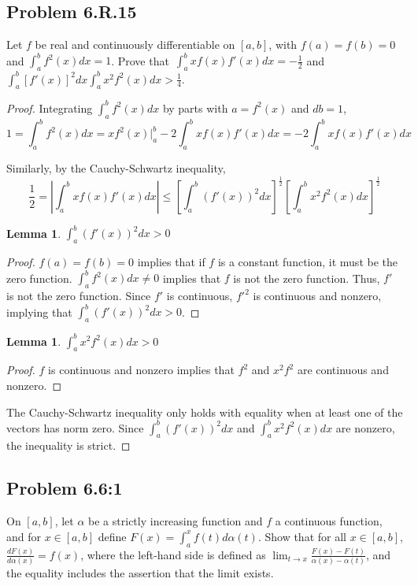 \documentclass{amsart}
\newtheorem{lemma}[theorem]{Lemma}
\begin{document}
\subsection*{Problem 6.R.15}
Let $f$ be real and continuously differentiable on $[a, b]$, with $f(a) = f(b) = 0$ and $\int_a^b f^2(x)dx = 1$. Prove that\ $\int_a^b xf(x)f'(x)dx = -\frac{1}{2}$ and $\int_a^b[f'(x)]^2dx \int_a^b x^2f^2(x)dx > \frac{1}{4}$.

\begin{proof}
Integrating $\int_a^b f^2(x)dx$ by parts with $a = f^2(x)$ and $db = 1$,
\[
1 = \int_a^bf^2(x)dx = xf^2(x)\Big|_a^b - 2\int_a^bxf(x)f'(x)dx = - 2\int_a^bxf(x)f'(x)dx
\]

Similarly, by the Cauchy-Schwartz inequality,
\[
\frac{1}{2} = \left|\int_a^b xf(x)f'(x)dx \right|
\leq \left[ \int_a^b (f'(x))^2 dx\right]^\frac{1}{2} \left[ \int_a^b x^2f^2(x)dx \right]^\frac{1}{2}
\]

\begin{lemma}
$\int_a^b (f'(x))^2 dx > 0$
\end{lemma}

\begin{proof}
$f(a) = f(b) = 0$ implies that if $f$ is a constant function, it must be the zero function. $\int_a^b f^2(x)dx \neq 0$ implies that $f$ is not the zero function. Thus, $f'$ is not the zero function. Since $f'$ is continuous, ${f'}^2$ is continuous and nonzero, implying that $\int_a^b (f'(x))^2 dx > 0$.
\end{proof}

\begin{lemma}
$\int_a^b x^2 f^2(x) dx > 0$
\end{lemma}

\begin{proof}
$f$ is continuous and nonzero implies that $f^2$ and $x^2 f^2$ are continuous and nonzero.
\end{proof}

The Cauchy-Schwartz inequality only holds with equality when at least one of the vectors has norm zero. Since $\int_a^b (f'(x))^2 dx$ and $\int_a^b x^2 f^2(x) dx$ are nonzero, the inequality is strict.

\end{proof}

\subsection*{Problem 6.6:1}

On $[a, b]$, let $\alpha$ be a strictly increasing function and $f$ a continuous function, and for $x \in [a, b]$ define $F(x) = \int_a^x f(t) d\alpha(t)$. Show that for all $x \in [a, b]$, $\frac{dF(x)}{d \alpha(x)} = f(x)$, where the left-hand side is defined as $\lim_{t \to x} \frac{F(x) - F(t)}{\alpha(x) - \alpha(t)}$, and the equality includes the assertion that the limit exists.
\end{document}

